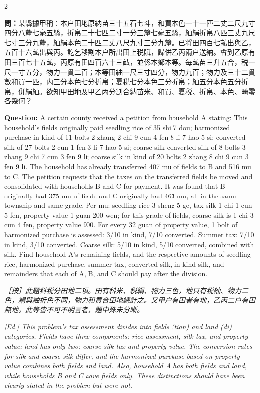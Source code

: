 \documentclass[11pt,a4paper]{article}
\newcommand{\QuestionText}[1]{\par\noindent\textbf{\color{problemcolor}問：}#1\par}
\newcommand{\EdNoteText}[1]{\par\noindent\textit{\color{ednotecolor}［按］#1}\par}
\newcommand{\QuestionEn}[1]{\par\noindent\textbf{\color{problemcolor}Question:} #1\par}
\newcommand{\EdNoteEn}[1]{\par\noindent\textit{\color{ednotecolor}[Ed.] #1}\par}
\begin{document}
\begin{paracol}{2}
\QuestionText{某縣據甲稱：本户田地原納苗三十五石七斗，和買本色一十一匹二丈二尺九寸四分八釐七毫五絲，折帛二十七匹二寸一分三釐七毫五絲，紬絹折帛八匹三丈九尺七寸三分九釐，紬絹本色二十匹二丈八尺九寸三分九釐。已将田四百七畆出與乙，五百十六畆出與丙。訖乞移割本户所出田上税賦，歸併乙丙兩户送納。㑹到乙原有田三百七十五畆，丙原有田四百六十三畆，並係本鄉本等。毎畆苗三升五合，税一尺一寸五分，物力一貫二百；本等田紬一尺三寸四分，物力九百；物力及三十二貫數和買一匹，内三分本色七分折帛；夏税七分本色三分折帛；紬五分本色五分折帛，併絹紬。欲知甲田地及甲乙丙分割合納苗米、和買、夏税、折帛、本色、畸零各幾何？}
\switchcolumn
\QuestionEn{A certain county received a petition from household A stating: This household's fields originally paid seedling rice of 35 shi 7 dou; harmonized purchase in kind of 11 bolts 2 zhang 2 chi 9 cun 4 fen 8 li 7 hao 5 si; converted silk of 27 bolts 2 cun 1 fen 3 li 7 hao 5 si; coarse silk converted silk of 8 bolts 3 zhang 9 chi 7 cun 3 fen 9 li; coarse silk in kind of 20 bolts 2 zhang 8 chi 9 cun 3 fen 9 li. The household has already transferred 407 mu of fields to B and 516 mu to C. The petition requests that the taxes on the transferred fields be moved and consolidated with households B and C for payment. It was found that B originally had 375 mu of fields and C originally had 463 mu, all in the same township and same grade. Per mu: seedling rice 3 sheng 5 ge, tax silk 1 chi 1 cun 5 fen, property value 1 guan 200 wen; for this grade of fields, coarse silk is 1 chi 3 cun 4 fen, property value 900. For every 32 guan of property value, 1 bolt of harmonized purchase is assessed: 3/10 in kind, 7/10 converted. Summer tax: 7/10 in kind, 3/10 converted. Coarse silk: 5/10 in kind, 5/10 converted, combined with silk. Find household A's remaining fields, and the respective amounts of seedling rice, harmonized purchase, summer tax, converted silk, in-kind silk, and remainders that each of A, B, and C should pay after the division.}
\switchcolumn*

\EdNoteText{此題科税分田地二項。田有科米、税絹、物力三色，地只有税紬、物力二色，絹與紬折色不同，物力和買合田地總計之。又甲户有田者有地，乙丙二户有田無地。此等皆不可不明言者，題中殊未分晰。}
\switchcolumn
\EdNoteEn{This problem's tax assessment divides into fields (tian) and land (di) categories. Fields have three components: rice assessment, silk tax, and property value; land has only two: coarse-silk tax and property value. The conversion rates for silk and coarse silk differ, and the harmonized purchase based on property value combines both fields and land. Also, household A has both fields and land, while households B and C have fields only. These distinctions should have been clearly stated in the problem but were not.}
\switchcolumn*


\end{paracol}
\end{document}
